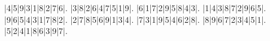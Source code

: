 \begin{sudoku}
|4|5|9|3|1|8|2|7|6|.
|3|8|2|6|4|7|5|1|9|.
|6|1|7|2|9|5|8|4|3|.
|1|4|3|8|7|2|9|6|5|.
|9|6|5|4|3|1|7|8|2|.
|2|7|8|5|6|9|1|3|4|.
|7|3|1|9|5|4|6|2|8|.
|8|9|6|7|2|3|4|5|1|.
|5|2|4|1|8|6|3|9|7|.
\end{sudoku}